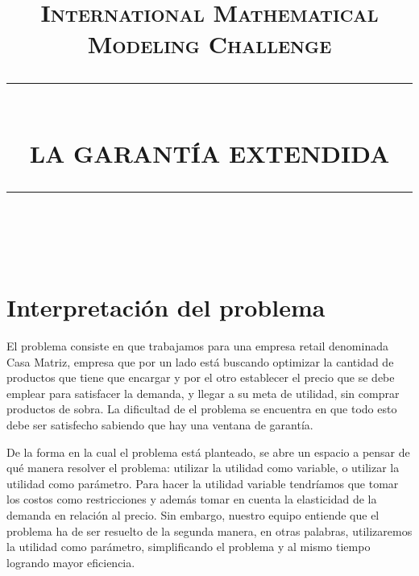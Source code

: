 \documentclass[12pt]{report}
\newcommand{\HRule}[1]{\rule{\linewidth}{#1}}
\begin{document}
\title{ \normalsize \textsc{International Mathematical Modeling Challenge}
		\\ [2.0cm]
		\HRule{2pt} \\ [0.5cm]
		\LARGE \textbf{\uppercase{La Garant\'ia Extendida}}
		\HRule{2pt} \\ [0.5cm]}



\maketitle
\singlespace
\renewcommand{\contentsname}{\'Indice} 
\vfill
\tableofcontents
\vfill
\newpage


\sectionfont{\scshape}



\section*{Interpretaci\'on del problema}

El problema consiste en que trabajamos para una empresa retail denominada Casa Matriz, empresa que por un lado est\'a buscando optimizar la cantidad de productos que tiene que encargar y por el otro establecer el precio que se debe emplear para satisfacer la demanda, y llegar a su meta de utilidad, sin comprar productos de sobra. La dificultad de el problema se encuentra en que todo esto debe ser satisfecho sabiendo que hay una ventana de garant\'ia. 
\par
De la forma en la cual el problema est\'a planteado, se abre un espacio a pensar de qu\'e manera resolver el problema: utilizar la utilidad como variable, o utilizar la utilidad como par\'ametro. Para hacer la utilidad variable tendr\'iamos que tomar los costos como restricciones y adem\'as tomar en cuenta la elasticidad de la demanda en relaci\'on al precio. Sin embargo, nuestro equipo entiende que el problema ha de ser resuelto de la segunda manera, en otras palabras, utilizaremos la utilidad como par\'ametro, simplificando el problema y al mismo tiempo logrando mayor eficiencia.
\end{document}
